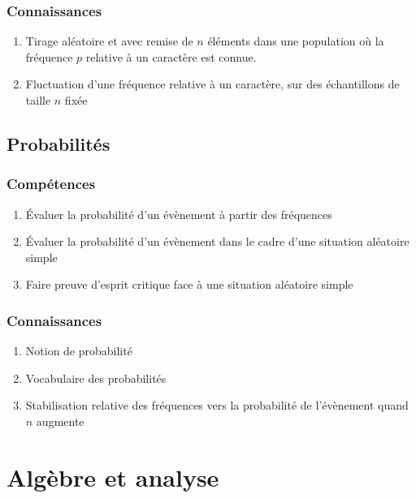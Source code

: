\documentclass[12pt,a4paper]{article}
\begin{document}
\subsubsection*{Connaissances}
\begin{enumerate}
	\item Tirage aléatoire  et avec remise de $n$ éléments dans une population où la fréquence $p$ relative à un caractère est connue.
	\item Fluctuation d'une fréquence relative à un caractère, sur des échantillons de taille $n$ fixée
\end{enumerate}


\subsection{Probabilités}
	\subsubsection*{Compétences}
	\begin{enumerate}
		\item Évaluer la probabilité d'un évènement à partir des fréquences
		\item Évaluer la probabilité d'un évènement dans le cadre d'une situation aléatoire simple
		\item Faire preuve d'esprit critique face à une situation aléatoire simple
		\end{enumerate}
		
		\subsubsection*{Connaissances}
		\begin{enumerate}
			\item Notion de probabilité
			\item Vocabulaire des probabilités
			\item Stabilisation relative des fréquences vers la probabilité de l'évènement quand $n$ augmente
			\end{enumerate}

\section{Algèbre et analyse}
\end{document}
